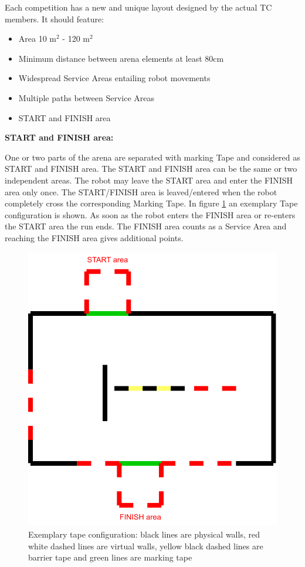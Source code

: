 Each competition has a new and unique layout designed by the actual TC members.
It should feature:
\begin{itemize}
	\item Area 10 m$^2$ - 120 m$^2$
	\item Minimum distance between arena elements at least $80\si{\centi\meter}$ 
	\item Widespread Service Areas entailing robot movements
	\item Multiple paths between Service Areas
	\item START and FINISH area
\end{itemize}

\clearpage
\textbf{START and FINISH area:}
\label{subsubsec: Start and Goal Area}

One or two parts of the arena are separated with marking Tape and considered as START and FINISH area. The START and FINISH area can be the same or two independent areas. The robot may leave the START area and enter the FINISH area only once. The START/FINISH area is leaved/entered when the robot completely cross the corresponding Marking Tape. In figure \ref{fig:tapeconfig} an exemplary Tape configuration is shown. As soon as the robot enters the FINISH area or re-enters the START area the run ends. The FINISH area counts as a Service Area and reaching the FINISH area gives additional points. 

\begin{figure} [h!]
	\begin{center}
		\includegraphics[width= 0.6\linewidth]{./images/arena/tabes.pdf}
	\end{center}
	\caption{Exemplary tape configuration: black lines are physical walls, red white dashed lines are virtual walls, yellow black dashed lines are barrier tape and green lines are marking tape}
	\label{fig:tapeconfig}
\end{figure}




